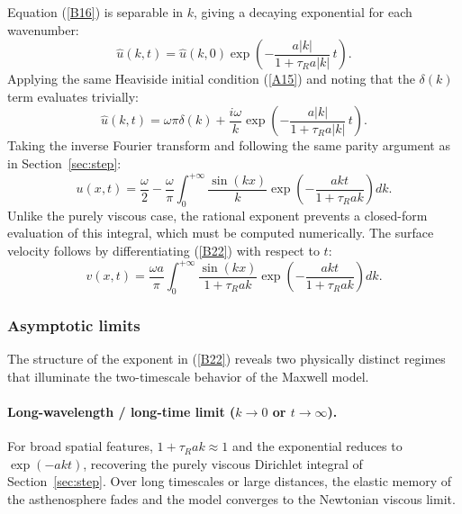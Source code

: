 \documentclass{article}
\begin{document}
Equation (\ref{B16}) is separable in $k$, giving a decaying exponential for
each wavenumber:
\begin{equation}
\hat{u}(k,t) = \hat{u}(k,0)\exp\!\left(-\frac{a|k|}{1+\tau_R a|k|}\,t\right).
\label{B17}
\end{equation}
Applying the same Heaviside initial condition (\ref{A15}) and noting that the
$\delta(k)$ term evaluates trivially:
\begin{equation}
\hat{u}(k,t) = \omega\pi\delta(k)
  + \frac{i\omega}{k}\exp\!\left(-\frac{a|k|}{1+\tau_R a|k|}\,t\right).
\label{B20}
\end{equation}
Taking the inverse Fourier transform and following the same parity argument
as in Section~\ref{sec:step}:
\begin{equation}
u(x,t) = \frac{\omega}{2}
  - \frac{\omega}{\pi}\int_0^{+\infty}
    \frac{\sin(kx)}{k}\exp\!\left(-\frac{akt}{1+\tau_R ak}\right)dk.
\label{B22}
\end{equation}
Unlike the purely viscous case, the rational exponent prevents a closed-form
evaluation of this integral, which must be computed numerically. The surface
velocity follows by differentiating (\ref{B22}) with respect to $t$:
\begin{equation}
v(x,t) = \frac{\omega a}{\pi}\int_0^{+\infty}
  \frac{\sin(kx)}{1+\tau_R ak}
  \exp\!\left(-\frac{akt}{1+\tau_R ak}\right)dk.
\label{B23v}
\end{equation}

\subsubsection{Asymptotic limits}

The structure of the exponent in (\ref{B22}) reveals two physically distinct
regimes that illuminate the two-timescale behavior of the Maxwell model.

\paragraph{Long-wavelength / long-time limit ($k\to 0$ or $t\to\infty$).}
For broad spatial features, $1+\tau_R ak\approx 1$ and the exponential
reduces to $\exp(-akt)$, recovering the purely viscous Dirichlet integral of
Section~\ref{sec:step}. Over long timescales or large distances, the elastic
memory of the asthenosphere fades and the model converges to the Newtonian
viscous limit.
\end{document}
